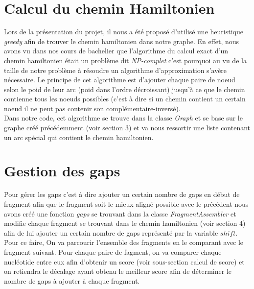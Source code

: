 \documentclass[a4paper, 12pt]{article}
\begin{document}
\section{Calcul du chemin Hamiltonien}
	Lors de la présentation du projet, il nous a été proposé d'utilisé une heuristique \textit{greedy} afin de trouver le chemin hamiltonien dans notre graphe. En effet, nous avons vu dans nos cours de bachelier que l'algorithme du calcul exact d'un chemin hamiltonien était un problème dit \textit{NP-complet} c'est pourquoi au vu de la taille de notre problème à résoudre un algorithme d'approximation s'avère nécessaire. Le principe de cet algorithme est d'ajouter chaque paire de noeud selon le poid de leur arc (poid dans l'ordre décroissant) jusqu'à ce que le chemin contienne tous les noeuds possibles (c'est à dire si un chemin contient un certain noeud il ne peut pas contenir son complémentaire-inversé).\\
	
	Dans notre code, cet algorithme se trouve dans la classe \textit{Graph} et se base sur le graphe créé précédemment (voir section 3) et va nous ressortir une liste contenant un arc spécial qui contient le chemin hamiltonien.\\
	
	


\section{Gestion des gaps}
	Pour gérer les gaps c'est à dire ajouter un certain nombre de gaps en début de fragment afin que le fragment soit le mieux aligné possible avec le précédent nous avons créé une fonction \textit{gaps} se trouvant dans la classe \textit{FragmentAssembler} et modifie chaque fragment se trouvant dans le chemin hamiltonien (voir section 4) afin de lui ajouter un certain nombre de gaps représenté par la variable $shift$.\\
	
	Pour ce faire, On va parcourir l'ensemble des fragments en le comparant avec le fragment suivant. Pour chaque paire de fagment, on va comparer chaque nucléotide entre eux afin d'obtenir un score (voir sous-section calcul de score) et on retiendra le décalage ayant obtenu le meilleur score afin de déterminer le nombre de gaps à ajouter à chaque fragment.
	
\end{document}
